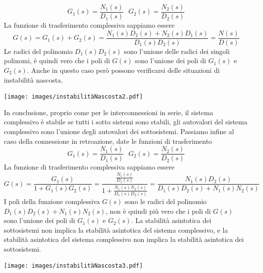 \documentclass[10pt, letterpaper]{report}
\begin{document}
$$ G_1(s)=\frac{N_1(s)}{D_1(s)} \ \ \  G_2(s)=\frac{N_2(s)}{D_2(s)} $$
La funzione di trasferimento complessiva sappiamo essere 
$$ G(s)=G_1(s)+G_2(s)=\frac{N_1(s)D_2(s)+N_2(s)D_1(s)}{D_1(s)D_2(s)}=\frac{N(s)}{D(s)}$$
Le radici del polinomio $D_1(s)D_2(s)$ sono l'unione delle radici dei singoli polinomi, 
è quindi vero che i poli di $G(s)$ sono l'unione dei poli di $G_1(s)$ e $G_2(s)$.  Anche in questo caso 
però possono verificarsi delle situazioni di instabilità nascosta.\begin{center}
    \texttt{[image: images/instabilitàNascosta2.pdf]}
\end{center}
In conclusione, proprio come per le interconnessioni in serie, il sistema complessivo è stabile se tutti i sotto sistemi sono stabili, gli autovalori del 
sistema complessivo sono l'unione degli autovalori dei sottosistemi.\acc 
Passiamo infine al caso della connessione in retroazione, date le funzioni di trasferimento 
$$ G_1(s)=\frac{N_1(s)}{D_1(s)} \ \ \  G_2(s)=\frac{N_2(s)}{D_2(s)} $$
La funzione di trasferimento complessiva sappiamo essere 
$$ G(s)=\frac{G_1(s)}{1+G_1(s)G_2(s)}=\frac{\frac{N_1(s)}{D_1(s)}}{1+\frac{N_1(s)N_2(s)}{D_1(s)D_2(s)}}
=\frac{N_1(s)D_2(s)}{D_1(s)D_2(s)+N_1(s)N_2(s)}$$
I poli della funzione complessiva $G(s)$ sono le radici del polinomio $D_1(s)D_2(s)+N_1(s)N_2(s)$, 
non è quindi più vero che i poli di $G(s)$ sono l'unione dei poli di $G_1(s)$ e $G_2(s)$. La stabilità 
asintotica dei sottosistemi non implica la stabilità asintotica del sistema complessivo, e 
la stabilità asintotica del sistema complessivo non implica la stabilità 
asintotica dei sottosistemi.\begin{center}
    \texttt{[image: images/instabilitàNascosta3.pdf]}
\end{center}
\end{document}
